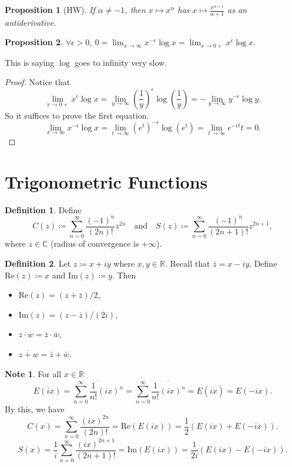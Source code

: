 \documentclass[12pt]{article}
\theoremstyle{plain}
\newtheorem*{prop}{Proposition}
\theoremstyle{definition}
\newtheorem*{defn}{Definition}
\newtheorem*{note}{Note}
\begin{document}
\begin{prop}[HW]
    If $\alpha\neq -1$, then $x\mapsto x^\alpha$ has $x\mapsto \frac{x^{\alpha+1}}{\alpha+1}$ as an antiderivative.
\end{prop}

\begin{prop}
    $\forall \epsilon>0$, $0 = \lim_{x\rightarrow\infty} x^{-\epsilon} \log x= \lim_{x\rightarrow 0+} x^\epsilon \log x$.
\end{prop}
This is saying $\log$ goes to infinity very slow.
\begin{proof}
    Notice that
    \[\lim_{x\rightarrow 0+}x^\epsilon \log x = \lim_{y\rightarrow \infty}\left(\frac{1}{y}\right)^\epsilon
    \log\left(\frac{1}{y}\right) = -\lim_{y\rightarrow \infty}y^{-\epsilon}\log y.\]
    So it suffices to prove the first equation.
    \[\lim_{x\rightarrow \infty}x^{-\epsilon}\log x = \lim_{t\rightarrow \infty}(e^t)^{-\epsilon} \log(e^t) =
    \lim_{t\rightarrow\infty} e^{-\epsilon t}t = 0.\]
\end{proof}

\section*{Trigonometric Functions}
\begin{defn}
    Define
    \[C(z)\coloneqq \sum_{n=0}^\infty \frac{(-1)^n}{(2n)!} z^{2n}\quad\text{and}\quad S(z)\coloneqq \sum_{n=0}^\infty
    \frac{(-1)^n}{(2n+1)!}z^{2n+1},\]
    where $z\in\mathbb{C}$ (radius of convergence is $+\infty$).
\end{defn}
\begin{defn}
    Let $z\coloneqq x+iy$ where $x,y\in\mathbb{R}$. 
    Recall that $\bar{z} = x-iy$.
    Define $\text{Re}(z)\coloneqq x$ and $\text{Im}(z)\coloneqq y$.
    Then 
    \begin{itemize}
        \item $\text{Re}(z) = (z+\bar{z})/2$,
        \item $\text{Im}(z) = (z-\bar{z})/(2i)$,
        \item $\overline{z\cdot w} = \bar{z}\cdot\bar{w}$,
        \item $\overline{z+w} = \bar{z} + \bar{w}$.
    \end{itemize}
\end{defn}

\begin{note}
    For all $x\in \mathbb{R}$
    \[\overline{E(ix)} = \overline{\sum_{n=0}^\infty \frac{1}{n!}(ix)^n} = \sum_{n=0}^\infty\overline{
    \frac{1}{n!}(ix)^n} = E(\overline{ix}) = E(-ix).\]
    By this, we have
    \[C(x) = \sum_{n=0}^\infty \frac{(ix)^{2n}}{(2n)!} = \text{Re}\left(E(ix)\right) = \frac{1}{2}\left(E(ix) +
    E(-ix)\right).\]
    \[S(x) = \frac{1}{i} \sum_{n=0}^\infty \frac{(ix)^{2n+1}}{(2n+1)!} = \text{Im}\left(E(ix)\right) = \frac{1}{2i} (E(ix) -
    E(-ix)).\]
\end{note}
\end{document}
